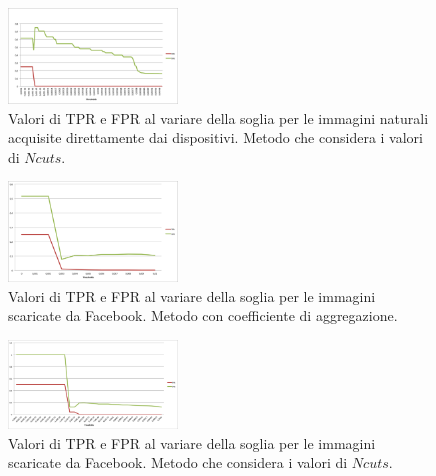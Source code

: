 \begin{figure}[h]
\begin{center}
\includegraphics[width=0.4\textwidth]{images/soglia_imgnat_NC.png}
\end{center}
  \caption{Valori di TPR e FPR al variare della soglia per le immagini naturali acquisite direttamente dai dispositivi. Metodo che considera i valori di $Ncuts$.}
\label{fig:soglia AC}
\end{figure}

\begin{figure}[h]
\begin{center}
\includegraphics[width=0.4\textwidth]{images/soglia_imgnat_fb_AC.png}
\end{center}
  \caption{Valori di TPR e FPR al variare della soglia per le immagini scaricate da Facebook. Metodo con coefficiente di aggregazione.}
\label{fig:soglia AC}
\end{figure}

\begin{figure}[h]
\begin{center}
\includegraphics[width=0.4\textwidth]{images/soglia_imgnat_fb_NC.png}
\end{center}
  \caption{Valori di TPR e FPR al variare della soglia per le immagini scaricate da Facebook. Metodo che considera i valori di $Ncuts$.}
\label{fig:soglia AC}
\end{figure}

